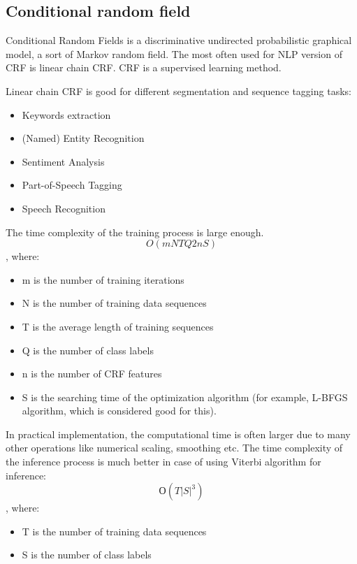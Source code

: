 \subsection{Conditional random field}

Conditional Random Fields is a discriminative undirected probabilistic graphical model, a sort of Markov random field. The most often used for NLP version of CRF is linear chain CRF. CRF is a supervised learning method.

Linear chain CRF is good for different segmentation and sequence tagging tasks:

\begin{itemize}
    \item Keywords extraction
    \item (Named) Entity Recognition
    \item Sentiment Analysis
    \item Part-of-Speech Tagging
    \item Speech Recognition
\end{itemize}

The time complexity of the training process is large enough.
\begin{equation*} O(mNTQ2nS) \end{equation*}
, where:
\begin{itemize}
    \item m is the number of training iterations\
    \item N is the number of training data sequences
    \item T is the average length of training sequences
    \item Q is the number of class labels
    \item n is the number of CRF features
    \item S is the searching time of the optimization algorithm (for example, L-BFGS algorithm, which is considered good for this).
\end{itemize}

In practical implementation, the computational time is often larger due to many other operations like numerical scaling, smoothing etc. The time complexity of the inference process is much better in case of using Viterbi algorithm for inference:
\begin{equation*} О(T|S|^3) \end{equation*}
, where:

\begin{itemize}
    \item T is the number of training data sequences
    \item S is the number of class labels
\end{itemize}

